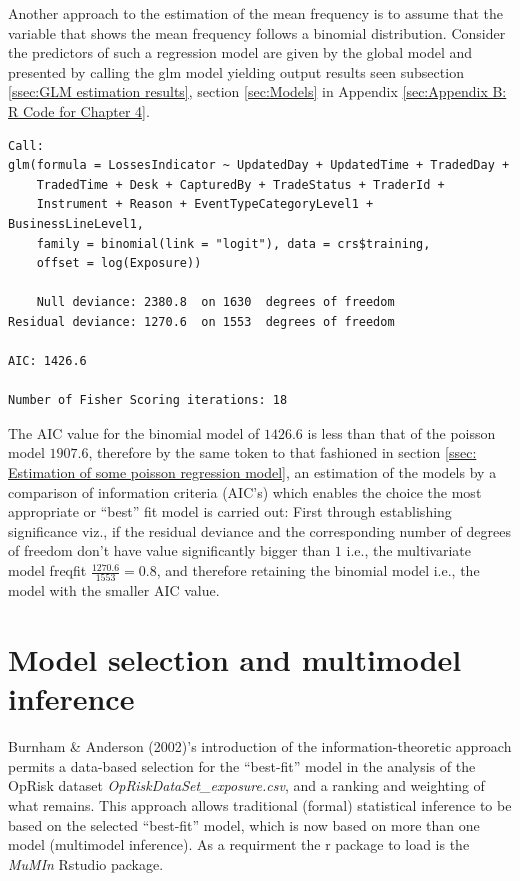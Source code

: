 \documentclass{DissertateUSU}
\begin{document}
Another approach to the estimation of the mean frequency is to assume
that the variable that shows the mean frequency follows a binomial
distribution. Consider the predictors of such a regression model are
given by the global model and presented by calling the glm model
yielding output results seen subsection
\ref{ssec:GLM estimation results}, section \ref{sec:Models} in Appendix
\ref{sec:Appendix B: R Code for Chapter 4}.

\singlespacing

\doublespacing

\singlespacing
\begin{verbatim}
Call:
glm(formula = LossesIndicator ~ UpdatedDay + UpdatedTime + TradedDay + 
    TradedTime + Desk + CapturedBy + TradeStatus + TraderId + 
    Instrument + Reason + EventTypeCategoryLevel1 + BusinessLineLevel1, 
    family = binomial(link = "logit"), data = crs$training,
    offset = log(Exposure))

    Null deviance: 2380.8  on 1630  degrees of freedom
Residual deviance: 1270.6  on 1553  degrees of freedom

AIC: 1426.6

Number of Fisher Scoring iterations: 18
\end{verbatim}
\doublespacing

The AIC value for the binomial model of \(1426.6\) is less than that of
the poisson model \(1907.6\), therefore by the same token to that
fashioned in section
\ref{ssec: Estimation of some poisson regression model}, an estimation
of the models by a comparison of information criteria (AIC's) which
enables the choice the most appropriate or ``best'' fit model is carried
out: First through establishing significance viz., if the residual
deviance and the corresponding number of degrees of freedom don't have
value significantly bigger than \(1\) i.e., the multivariate model
freqfit \(\frac{1270.6}{1553} = 0.8\), and therefore retaining the
binomial model i.e., the model with the smaller AIC value.

\section{Model selection and multimodel inference}

Burnham \& Anderson (2002)'s introduction of the information-theoretic
approach permits a data-based selection for the ``best-fit'' model in
the analysis of the OpRisk dataset \emph{OpRiskDataSet\_exposure.csv},
and a ranking and weighting of what remains. This approach allows
traditional (formal) statistical inference to be based on the selected
``best-fit'' model, which is now based on more than one model
(multimodel inference). As a requirment the r package to load is the
\emph{MuMIn} Rstudio package. \medskip
\end{document}
